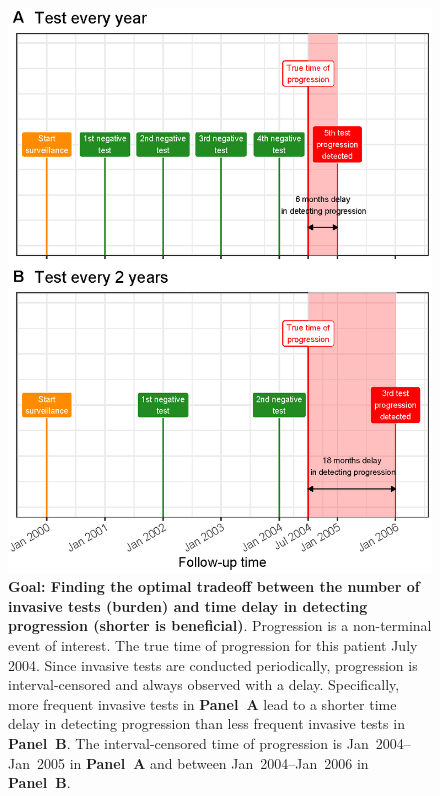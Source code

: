 \begin{figure}
\centerline{\includegraphics{images/delay_explanation.eps}}
\caption{\textbf{Goal: Finding the optimal tradeoff between the number of invasive tests (burden) and time delay in detecting progression (shorter is beneficial)}. Progression is a non-terminal event of interest. The true time of progression for this patient July 2004. Since invasive tests are conducted periodically, progression is interval-censored and always observed with a delay. Specifically, more frequent invasive tests in \textbf{Panel~A} lead to a shorter time delay in detecting progression than less frequent invasive tests in \textbf{Panel~B}. The interval-censored time of progression is Jan~2004--Jan~2005 in \textbf{Panel~A} and between Jan~2004--Jan~2006 in \textbf{Panel~B}.} 
\label{fig:delay_explanation}
\end{figure}

